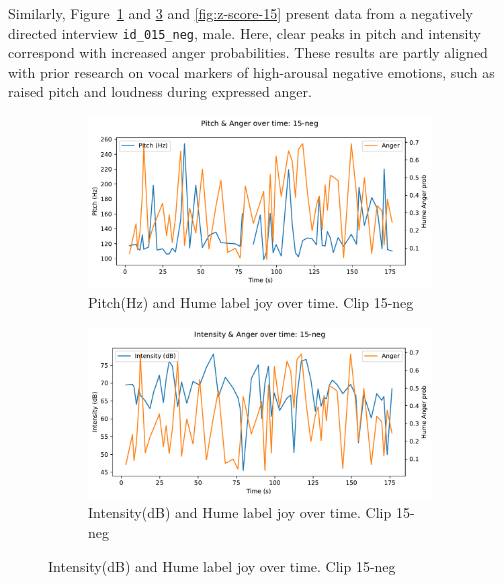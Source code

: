 Similarly, Figure~\ref{fig:pitch-15-neg} and \ref{fig:intensity-15-neg} and \ref{fig:z-score-15} present data from a negatively directed interview \texttt{id\_015\_neg}, male. Here, clear peaks in pitch and intensity correspond with increased anger probabilities. These results are partly aligned with prior research on vocal markers of high-arousal negative emotions, such as raised pitch and loudness during expressed anger. 

\begin{figure}[H]
    \centering
    \begin{subfigure}[b]{0.47\textwidth}
        \includegraphics[width=\linewidth]{png/results/rq1/pitch_anger_15-neg.pdf}
        \caption{Pitch(Hz) and Hume label joy over time. Clip 15-neg}
        \label{fig:pitch-15-neg}
    \end{subfigure}
    \hspace{0.04\textwidth}
    \begin{subfigure}[b]{0.47\textwidth}
        \includegraphics[width=\linewidth]{png/results/rq1/intensity_anger_15-neg.pdf}
        \caption{Intensity(dB) and Hume label joy over time. Clip 15-neg}
        \label{fig:intensity-15-neg}
    \end{subfigure}
\end{figure}

